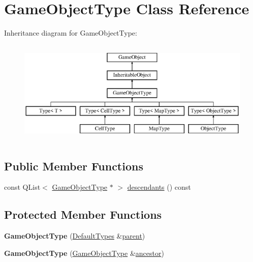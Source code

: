 \hypertarget{class_game_object_type}{\section{\-Game\-Object\-Type \-Class \-Reference}
\label{class_game_object_type}
}
\-Inheritance diagram for \-Game\-Object\-Type\-:\begin{figure}[H]
\begin{center}
\leavevmode
\includegraphics[height=5.000000cm]{class_game_object_type}
\end{center}
\end{figure}
\subsection*{\-Public \-Member \-Functions}
\begin{DoxyCompactItemize}
\item 
const \-Q\-List$<$ \hyperlink{class_game_object_type}{\-Game\-Object\-Type} $\ast$ $>$ \hyperlink{class_game_object_type_a68c3d9aeec4b7b259b03b98aca307397}{descendants} () const 
\end{DoxyCompactItemize}
\subsection*{\-Protected \-Member \-Functions}
\begin{DoxyCompactItemize}
\item 
\hypertarget{class_game_object_type_a7c2ad7a00f9240d2bf29db0ac3b1314f}{{\bfseries \-Game\-Object\-Type} (\hyperlink{class_default_types}{\-Default\-Types} \&\hyperlink{class_game_object_af3deaf39cde23c189765634e32e95bb4}{parent})}\label{class_game_object_type_a7c2ad7a00f9240d2bf29db0ac3b1314f}

\item 
\hypertarget{class_game_object_type_a9388a78893199c74f16edb92ae087dd2}{{\bfseries \-Game\-Object\-Type} (\hyperlink{class_game_object_type}{\-Game\-Object\-Type} \&\hyperlink{class_inheritable_object_ac87a3c55ca4be252c527a29fe162bb15}{ancestor})}\label{class_game_object_type_a9388a78893199c74f16edb92ae087dd2}

\end{DoxyCompactItemize}



